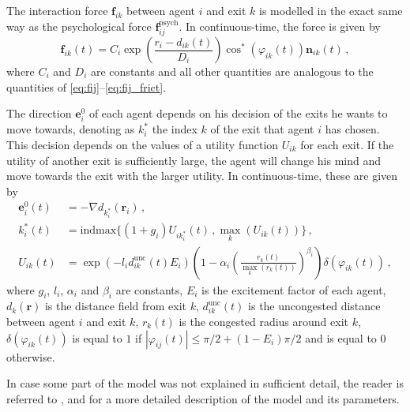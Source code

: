 The interaction force $\bm{f}_{ik}$ between agent $i$ and exit $k$ is modelled in the exact same way as the psychological force $\bm{f}_{ij}^{\mathrm{psych}}$. In continuous-time, the force is given by
\begin{equation} \label{eq:fik}
	\bm{f}_{ik}(t) = C_i \exp\left(\frac{r_{i}-d_{ik}(t)}{D_i}\right) \cos^*(\varphi_{ik}(t)) \bm{n}_{ik}(t) \,,
\end{equation}
where $C_i$ and $D_i$ are constants and all other quantities are analogous to the quantities of \eqref{eq:fij}--\eqref{eq:fij_frict}.

The direction $\bm{e}_i^0$ of each agent depends on his decision of the exits he wants to move towards, denoting as $k_i^*$ the index $k$ of the exit that agent $i$ has chosen. This decision depends on the values of a utility function $U_{ik}$ for each exit. If the utility of another exit is sufficiently large, the agent will change his mind and move towards the exit with the larger utility. In continuous-time, these are given by
\begin{subequations}
\begin{align}
	\bm{e}_i^0(t) & = - \nabla d_{k_i^*}(\bm{r}_i) \,, \label{eq:ei} \\
	k_i^*(t) & = \mathrm{indmax}\{ (1+g_i) U_{ik_i^*}(t) \,, \max_k\left(U_{ik}(t)\right) \} \,, \label{eq:ki} \\
	U_{ik}(t) & = \exp\left( -l_i d_{ik}^{\mathrm{unc}}(t) E_i \right) \left(1-\alpha_i\left(\frac{r_k(t)}{\max_k\left(r_k(t)\right)}\right)^{\beta_i}\right) \delta(\varphi_{ik}(t)) \,, \label{eq:Uik}
\end{align}
\end{subequations}
where $g_i$, $l_i$, $\alpha_i$ and $\beta_i$ are constants, $E_i$ is the excitement factor of each agent, $d_k(\bm{r})$ is the distance field from exit $k$, $d_{ik}^{\mathrm{unc}}(t)$ is the uncongested distance between agent $i$ and exit $k$, $r_k(t)$ is the congested radius around exit $k$, $\delta(\varphi_{ik}(t))$ is equal to $1$ if $|\varphi_{ij}(t)| \leq \pi/2 + (1-E_i)\pi/2$ and is equal to $0$ otherwise.

In case some part of the model was not explained in sufficient detail, the reader is referred to \cite{Helbing2000}, \cite{Zainuddin2010} and \cite{Wang2016} for a more detailed description of the model and its parameters.


